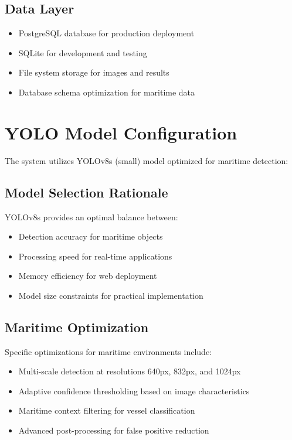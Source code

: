 \documentclass[12pt,a4paper]{report}
\begin{document}
\subsection{Data Layer}
\begin{itemize}
    \item PostgreSQL database for production deployment
    \item SQLite for development and testing
    \item File system storage for images and results
    \item Database schema optimization for maritime data
\end{itemize}

\section{YOLO Model Configuration}
The system utilizes YOLOv8s (small) model optimized for maritime detection:

\subsection{Model Selection Rationale}
YOLOv8s provides an optimal balance between:
\begin{itemize}
    \item Detection accuracy for maritime objects
    \item Processing speed for real-time applications
    \item Memory efficiency for web deployment
    \item Model size constraints for practical implementation
\end{itemize}

\subsection{Maritime Optimization}
Specific optimizations for maritime environments include:
\begin{itemize}
    \item Multi-scale detection at resolutions 640px, 832px, and 1024px
    \item Adaptive confidence thresholding based on image characteristics
    \item Maritime context filtering for vessel classification
    \item Advanced post-processing for false positive reduction
\end{itemize}
\end{document}
